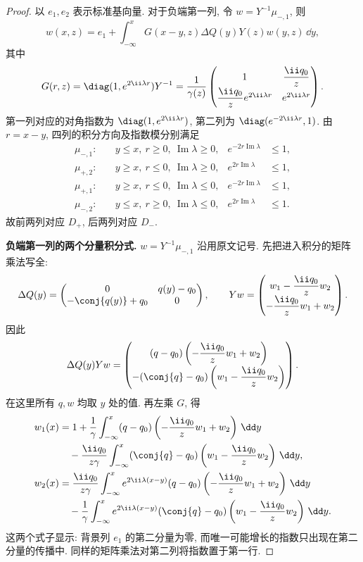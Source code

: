 \begin{proof}
以 $e_1,e_2$ 表示标准基向量. 对于负端第一列, 令 $w=Y^{-1}\mu_{-,1}$, 则
\begin{equation}\label{eq:jost-column-volterra}
w(x,z)=e_1+\int_{-\infty}^{x}G(x-y,z)\Delta Q(y)Y(z)w(y,z)\,\dd y,
\end{equation}
其中
\begin{equation}\label{eq:jost-Gkernel}
G(r,z)=\diag(1,e^{2\ii\lambda r})Y^{-1}
=\dfrac{1}{\gamma(z)}
\begin{pmatrix}
1&\dfrac{\ii q_0}{z}\\[4pt]
\dfrac{\ii q_0}{z}e^{2\ii\lambda r}&e^{2\ii\lambda r}
\end{pmatrix}.
\end{equation}
第一列对应的对角指数为 $\diag(1,e^{2\ii\lambda r})$, 第二列为 $\diag(e^{-2\ii\lambda r},1)$. 由 $r=x-y$, 四列的积分方向及指数模分别满足
\begin{align*}
\mu_{-,1}:&\quad y\le x,\ r\ge0,\ \operatorname{Im}\lambda\ge0,
& e^{-2r\operatorname{Im}\lambda}&\le1,\\
\mu_{+,2}:&\quad y\ge x,\ r\le0,\ \operatorname{Im}\lambda\ge0,
& e^{2r\operatorname{Im}\lambda}&\le1,\\
\mu_{+,1}:&\quad y\ge x,\ r\le0,\ \operatorname{Im}\lambda\le0,
& e^{-2r\operatorname{Im}\lambda}&\le1,\\
\mu_{-,2}:&\quad y\le x,\ r\ge0,\ \operatorname{Im}\lambda\le0,
& e^{2r\operatorname{Im}\lambda}&\le1.
\end{align*}
故前两列对应 $D_+$, 后两列对应 $D_-$.


\par\medskip\noindent\textbf{负端第一列的两个分量积分式.}\quad 
$w=Y^{-1}\mu_{-,1}$ 沿用原文记号. 先把进入积分的矩阵乘法写全:
\[
\Delta Q(y)=\begin{pmatrix}0&q(y)-q_0\\
-\conj{q(y)}+q_0&0\end{pmatrix},
\qquad
Yw=\begin{pmatrix}
w_1-\dfrac{\ii q_0}{z}w_2\\
-\dfrac{\ii q_0}{z}w_1+w_2
\end{pmatrix}.
\]
因此
\[
\Delta Q(y)Yw
=\begin{pmatrix}
(q-q_0)\left(-\dfrac{\ii q_0}{z}w_1+w_2\right)\\
-(\conj{q}-q_0)\left(w_1-\dfrac{\ii q_0}{z}w_2\right)
\end{pmatrix}.
\]
在这里所有 $q,w$ 均取 $y$ 处的值. 再左乘 $G$, 得
\begin{align*}
w_1(x)
&=1+\dfrac{1}{\gamma}\int_{-\infty}^{x}
(q-q_0)\left(-\dfrac{\ii q_0}{z}w_1+w_2\right)\,\dd y\\
&\quad-\dfrac{\ii q_0}{z\gamma}\int_{-\infty}^{x}(\conj{q}-q_0)
\left(w_1-\dfrac{\ii q_0}{z}w_2\right)\,\dd y,\\
w_2(x)
&=\dfrac{\ii q_0}{z\gamma}\int_{-\infty}^{x}e^{2\ii\lambda(x-y)}(q-q_0)
\left(-\dfrac{\ii q_0}{z}w_1+w_2\right)\,\dd y\\
&\quad-\dfrac{1}{\gamma}\int_{-\infty}^{x}e^{2\ii\lambda(x-y)}
(\conj{q}-q_0)\left(w_1-\dfrac{\ii q_0}{z}w_2\right)\,\dd y.
\end{align*}
这两个式子显示: 背景列 $e_1$ 的第二分量为零,
而唯一可能增长的指数只出现在第二分量的传播中.
同样的矩阵乘法对第二列将指数置于第一行.


\end{proof}
